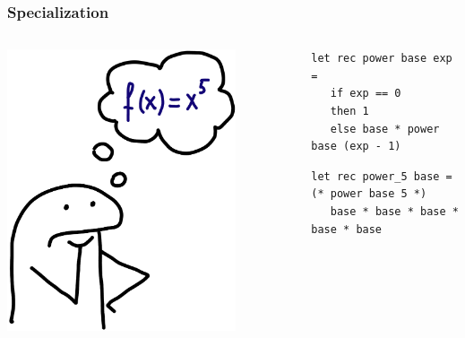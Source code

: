 \documentclass[xcolor={dvipsnames}, aspectratio=169]{beamer}
\begin{document}
\begin{frame}[fragile]
  \frametitle{Specialization}

  \begin{columns}    
    \begin{column}{0.35\textwidth}
      \centering
      \includegraphics[width=0.8\textwidth]{pic/power.jpg}
    \end{column}
    \begin{column}{0.75\textwidth} 
      \begin{lstlisting}[language=ocanren]
 let rec power base exp = 
   if exp == 0 
   then 1 
   else base * power base (exp - 1)
          \end{lstlisting}

          \begin{lstlisting}[language=ocanren]
 let rec power_5 base =                    (* power base 5 *)
   base * base * base * base * base 
           \end{lstlisting}
        \end{column}
        \end{columns}

\end{frame}
\end{document}
